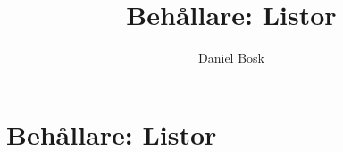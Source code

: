 \documentclass[a4paper,10pt,oneside,openright,
               oldfontcommands]{memoir}
\begin{document}
\title{%
  Behållare: Listor
}
\author{Daniel Bosk}

\maketitle

\begin{abstract}
  
\end{abstract}

\clearpage

\tableofcontents*

\chapter{Behållare: Listor}



\appendix


\printbibliography
\end{document}
